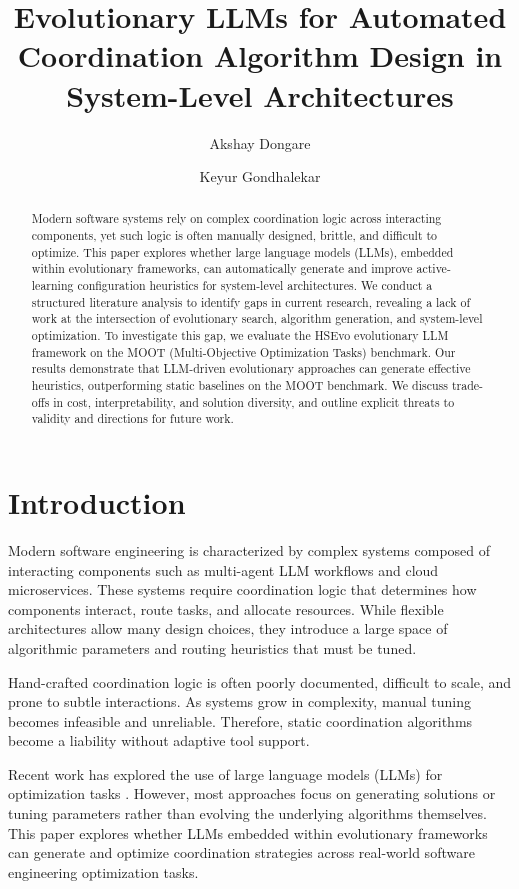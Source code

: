 \documentclass[sigconf,nonacm]{acmart}
\title{Evolutionary LLMs for Automated Coordination Algorithm Design in System-Level Architectures}
\author{Akshay Dongare}
\affiliation{
  \institution{North Carolina State University}
  \city{Raleigh}
  \state{NC}
  \country{USA}
}
\author{Keyur Gondhalekar}
\affiliation{
  \institution{North Carolina State University}
  \city{Raleigh}
  \state{NC}
  \country{USA}
}
\begin{document}
\begin{abstract}
Modern software systems rely on complex coordination logic across interacting components, yet such logic is often manually designed, brittle, and difficult to optimize. This paper explores whether large language models (LLMs), embedded within evolutionary frameworks, can automatically generate and improve active-learning configuration heuristics for system-level architectures. We conduct a structured literature analysis to identify gaps in current research, revealing a lack of work at the intersection of evolutionary search, algorithm generation, and system-level optimization. To investigate this gap, we evaluate the HSEvo evolutionary LLM framework on the MOOT (Multi-Objective Optimization Tasks) benchmark. Our results demonstrate that LLM-driven evolutionary approaches can generate effective heuristics, outperforming static baselines on the MOOT benchmark. We discuss trade-offs in cost, interpretability, and solution diversity, and outline explicit threats to validity and directions for future work.
\end{abstract}

\maketitle

\section{Introduction}

Modern software engineering is characterized by complex systems composed of interacting components such as multi-agent LLM workflows and cloud microservices. These systems require coordination logic that determines how components interact, route tasks, and allocate resources. While flexible architectures allow many design choices, they introduce a large space of algorithmic parameters and routing heuristics that must be tuned.

Hand-crafted coordination logic is often poorly documented, difficult to scale, and prone to subtle interactions. As systems grow in complexity, manual tuning becomes infeasible and unreliable. Therefore, static coordination algorithms become a liability without adaptive tool support.

Recent work has explored the use of large language models (LLMs) for optimization tasks \cite{romera2023mathematical}. However, most approaches focus on generating solutions or tuning parameters rather than evolving the underlying algorithms themselves. This paper explores whether LLMs embedded within evolutionary frameworks can generate and optimize coordination strategies across real-world software engineering optimization tasks.
\end{document}
